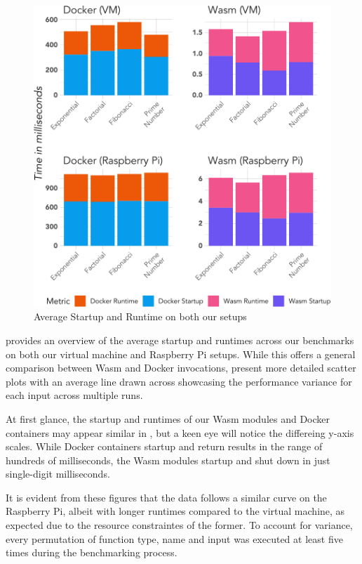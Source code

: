 \documentclass[
  table]{report}
\begin{document}
\begin{figure}[H]

{\centering \includegraphics{thesis_files/figure-latex/avg-times-nrec-rpi-1} 

}

\caption{Average Startup and Runtime on both our setups}\label{fig:avg-times-nrec-rpi}
\end{figure}

 provides an overview of the average
startup and runtimes across our benchmarks on both our virtual machine
and Raspberry Pi setups. While this offers a general comparison between
\ac{Wasm} and Docker invocations,
 present more detailed
scatter plots with an average line drawn across showcasing the
performance variance for each input across multiple runs.

At first glance, the startup and runtimes of our \ac{Wasm} modules and
Docker containers may appear similar in ,
but a keen eye will notice the differeing y-axis scales. While Docker
containers startup and return results in the range of hundreds of
milliseconds, the \ac{Wasm} modules startup and shut down in just
single-digit milliseconds.

It is evident from these figures that the data follows a similar curve
on the Raspberry Pi, albeit with longer runtimes compared to the virtual
machine, as expected due to the resource constraintes of the former. To
account for variance, every permutation of function type, name and input
was executed at least five times during the benchmarking process.
\end{document}
